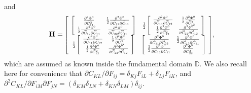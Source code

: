 \documentclass[CRPHYS,Unicode,manuscript]{cedram}
\begin{document}
and
  \begin{alignat*}{1}
  \bf H=\label{eqn:ftenscom}
  \scalebox{.75}{$
\left[\begin{array}{cc}
\left[\begin{array}{cc}
\frac{\partial^{2}\Phi^{0}}{\partial\widetilde{C}_{11}^{2}} & \frac{1}{2}\frac{\partial^2\Phi^{0}}{\partial\widetilde{C}_{12}\partial\widetilde{C}_{11}}\\
\frac{1}{2}\frac{\partial^2\Phi^{0}}{\partial\widetilde{C}_{12}\partial\widetilde{C}_{11}} & \frac{\partial^{2}\Phi^{0}}{\partial\widetilde{C}_{22}\partial\widetilde{C}_{11}}
\end{array}\right] & \frac{1}{2}\left[\begin{array}{cc}
\frac{\partial^2\Phi^{0}}{\partial\widetilde{C}_{11}\partial\widetilde{C}_{12}} & \frac{1}{2}\frac{\partial^2\Phi^{0}}{\partial\widetilde{C}_{12}^{2}}\\
\frac{1}{2}\frac{\partial^2\Phi^{0}}{\partial\widetilde{C}_{12}^{2}} & \frac{\partial^2\Phi^{0}}{\partial\widetilde{C}_{22}\partial\widetilde{C}_{12}}
\end{array}\right]\\
\frac{1}{2}\left[\begin{array}{cc}
\frac{\partial^2\Phi^{0}}{\partial\widetilde{C}_{11}\partial\widetilde{C}_{12}} & \frac{1}{2}\frac{\partial^2\Phi^{0}}{\partial\widetilde{C}_{12}^{2}}\\
\frac{1}{2}\frac{\partial^2\Phi^{0}}{\partial\widetilde{C}_{12}^{2}} & \frac{\partial^2\Phi^{0}}{\partial\widetilde{C}_{22}\partial\widetilde{C}_{12}}
\end{array}\right] & \left[\begin{array}{cc}
\frac{\partial^{2}\Phi^{0}}{\partial\widetilde{C}_{11}\partial\widetilde{C}_{22}} & \frac{1}{2}\frac{\partial^2\Phi^{0}}{\partial\widetilde{C}_{12}\partial\widetilde{C}_{11}}\\
\frac{1}{2}\frac{\partial^2\Phi^{0}}{\partial\widetilde{C}_{12}\partial\widetilde{C}_{11}} & \frac{\partial^{2}\Phi^{0}}{\partial\widetilde{C}_{22}^{2}}
\end{array}\right]
\end{array}\right]$},
 \end{alignat*} 
 which are assumed  as known   inside  the fundamental domain $\mathbb D$.  We also recall here for convenience that $  \partial C_{KL}/\partial F_{ij} = \delta_{Kj}F_{iL} + \delta_{Lj}F_{iK}
 $, and  $ \partial ^2C_{KL}/\partial F_{iM}\partial F_{jN}  = (\delta_{KM}  \delta_{LN}+ \delta_{KN} \delta_{LM})\delta_{ij}.$ 
\end{document}
